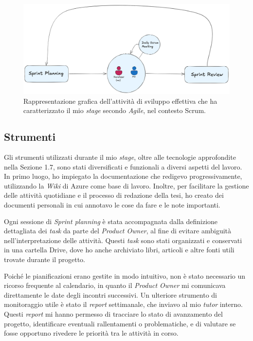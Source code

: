         \begin{figure}[H]
            \centering
            \includegraphics[width=0.7\linewidth]{BCS-Tessi/images/Sprint_true.png}
            \caption[Rappresentazione dell'attività di sviluppo effettiva secondo \textit{Agile} (Scrum)]{Rappresentazione grafica dell'attività di sviluppo effettiva che ha caratterizzato il mio \textit{stage} secondo \textit{Agile}, nel contesto Scrum.}
            \label{fig:Sprint-effettivi}
        \end{figure}
        
        \subsection{Strumenti}
        Gli strumenti utilizzati durante il mio \textit{stage}, oltre alle tecnologie approfondite nella Sezione 1.7, sono stati diversificati e funzionali a diversi aspetti del lavoro. In primo luogo, ho impiegato la documentazione che redigevo progressivamente, utilizzando la \textit{Wiki} di Azure come base di lavoro. Inoltre, per facilitare la gestione delle attività quotidiane e il processo di redazione della tesi, ho creato dei documenti personali in cui annotavo le cose da fare e le note importanti. 

        \vspace{0.2 em}
        \noindent Ogni sessione di \textit{Sprint planning} è stata accompagnata dalla definizione dettagliata dei \textit{task} da parte del \textit{Product Owner}, al fine di evitare ambiguità nell'interpretazione delle attività. Questi \textit{task} sono stati organizzati e conservati in una cartella Drive, dove ho anche archiviato libri, articoli e altre fonti utili trovate durante il progetto. 

        \vspace{0.2 em}
        \noindent Poiché le pianificazioni erano gestite in modo intuitivo, non è stato necessario un ricorso frequente al calendario, in quanto il \textit{Product Owner} mi comunicava direttamente le date degli incontri successivi. Un ulteriore strumento di monitoraggio utile è stato il \textit{report} settimanale, che inviavo al mio \textit{tutor} interno. Questi \textit{report} mi hanno permesso di tracciare lo stato di avanzamento del progetto, identificare eventuali rallentamenti o problematiche, e di valutare se fosse opportuno rivedere le priorità tra le attività in corso.
        
